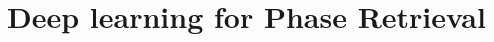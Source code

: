 \documentclass[12pt]{book}
\begin{document}
\part{Deep learning for Phase Retrieval}\label{part:study}



%


% 
\printbibliography
{}

\begin{appendices}%
\appendixheaderon
\label{part:annexe}

\end{appendices}
\end{document}
